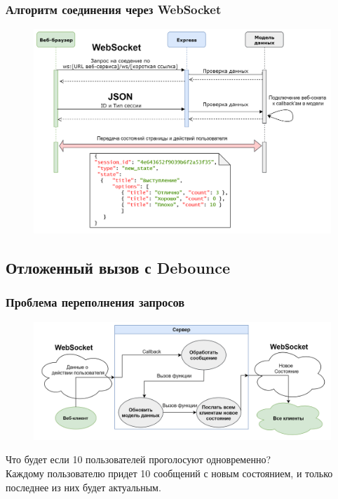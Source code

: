 \documentclass{beamer}
\begin{document}
\begin{frame}
\frametitle{Алгоритм соединения через WebSocket}
\begin{figure}
	\includegraphics[width=\linewidth]{img/wsdiagram.png}
\end{figure}
\end{frame}

\subsection{Отложенный вызов с Debounce}
\begin{frame}
\frametitle{Проблема переполнения запросов}
\begin{figure}
	\includegraphics[width=\linewidth]{img/nodeb.png}
\end{figure}
	Что будет если 10 пользователей проголосуют одновременно?\\
	Каждому пользователю придет 10 сообщений с новым состоянием, и только последнее из них будет актуальным.  
\end{frame}
\end{document}
